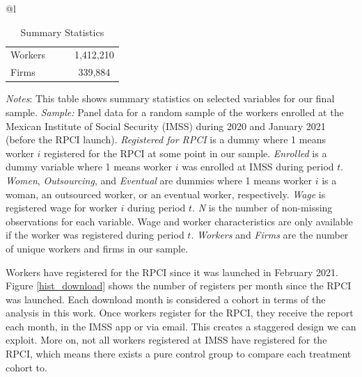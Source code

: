 \documentclass[10pt, oneside]{book}
\begin{document}
\begin{table}[H]
\footnotesize
\centering
\begin{threeparttable}
\centering
\caption{Summary Statistics\label{tab:summary_stats_rpci}}

\begin{tabular}[t]{@{}l}
\toprule
\toprule
\begin{tabular}[t]{lccc}

\midrule
Workers & & & 1,412,210\\
Firms & & & 339,884\\
\end{tabular}

\tabularnewline 
\bottomrule
\bottomrule

\end{tabular}

\begin{tablenotes}
\setlength{}
\scriptsize
\item \textit{Notes}: This table shows summary statistics on selected variables for our final sample. \textit{Sample:} Panel data for a random sample of the workers enrolled at the Mexican Institute of Social Security (IMSS) during 2020 and January 2021 (before the RPCI launch). \textit{Registered for RPCI} is a dummy where 1 means worker $i$ registered for the RPCI at some point in our sample. \textit{Enrolled} is a dummy variable where 1 means worker $i$ was enrolled at IMSS during period $t$. \textit{Women}, \textit{Outsourcing}, and \textit{Eventual} are dummies where 1 means worker $i$ is a woman, an outsourced worker, or an eventual worker, respectively. \textit{Wage} is registered wage for worker $i$ during period $t$. \textit{N} is the number of non-missing observations for each variable. Wage and worker characteristics are only available if the worker was registered during period $t$. \textit{Workers} and \textit{Firms} are the number of unique workers and firms in our sample. %
\end{tablenotes}
\end{threeparttable}
\end{table}


Workers have registered for the RPCI since it was launched in February 2021. Figure \ref{hist_download} shows the number of registers per month since the RPCI was launched. Each download month is considered a cohort in terms of the analysis in this work. Once workers register for the RPCI, they receive the report each month, in the IMSS app or via email. This creates a staggered design we can exploit. More on, not all workers registered at IMSS have registered for the RPCI, which means there exists a pure control group to compare each treatment cohort to.  \\
\end{document}
